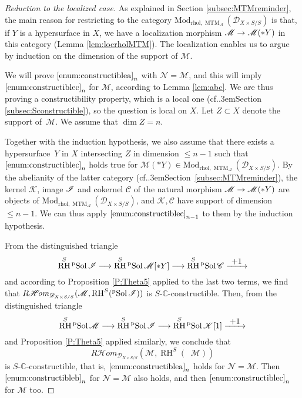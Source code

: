 \documentclass[english]{smfart}
\numberwithin{subsection}{section}
\def\sha{\mathcal{A}}\let\cA\sha
\def\shc{\mathcal{C}}
\def\shd{\mathcal{D}}\let\cD\shd
\def\shk{\mathcal{K}}\let\shk\shk
\def\shm{\mathcal{M}}
\def\shn{\mathcal{N}}\let\shn\shn
\newcommand{\C}{\mathbb{C}}\let\CC\C
\newcommand{\Rhom}{R\shhom}
\newcommand{\shhom}{\mathcal{H}\!\mathit{om}}\let\ho\shhom
\DeclareMathOperator{\RH}{RH}
\newcommand{\rhol}{\mathrm{rhol}}
\newcommand{\Mod}{\mathrm{Mod}}
\newcommand{\XS}{X\times S}
\newcommand{\DXS}{\shd_{\XS/S}}
\DeclareMathOperator{\MTM}{MTM}
\DeclareMathOperator{\pSol}{{}^\mathrm{p}Sol}
\let\leq\leqslant
\def\cf{cf.\kern.3em}
\numberwithin{equation}{section}
\theoremstyle{plain}
\theoremstyle{definition}
\def\to{\mathchoice{\longrightarrow}{\rightarrow}{\rightarrow}{\rightarrow}}
\def\To#1{\mathchoice{\xrightarrow{\textstyle\kern4pt#1\kern3pt}}{\stackrel{#1}{\longrightarrow}}{}{}}
\begin{document}
\begin{proof}[Reduction to the localized case]
As explained in Section \ref{subsec:MTMreminder}, the main reason for restricting to the category $\Mod_{\rhol,\MTM_\sha}(\DXS)$ is that, if $Y$ is a hypersurface in $X$, we have a localization morphism $\shm\to\shm(*Y)$ in this category (Lemma \ref{lem:locrholMTM}). The localization enables us to argue by induction on the dimension of the support of $\shm$.

We will prove $\eqref{enum:constructiblea}_n$ with $\shn=\shm$, and this will imply $\eqref{enum:constructiblec}_n$ for $\shm$, according to Lemma \ref{lem:abc}. We are thus proving a constructibility property, which is a local one (\cf Section \ref{subsec:Sconstructible}), so the question is local on $X$. Let $Z\subset X$ denote the support of~$\shm$. We assume that $\dim Z=n$.

Together with the induction hypothesis, we also assume that there exists a hypersurface~$Y$ in $X$ intersecting $Z$ in dimension $\leq n-1$ such that $\eqref{enum:constructiblec}_n$ holds true for $\shm(*Y)\in\Mod_{\rhol,\MTM_\sha}(\DXS)$. By the abelianity of the latter category (\cf Section~\ref{subsec:MTMreminder}), the kernel $\shk$, image $\cI$ and cokernel $\shc$ of the natural morphism $\shm\to\shm(*Y)$ are objects of $\Mod_{\rhol,\MTM_\sha}(\DXS)$, and $\shk,\shc$ have support of dimension $\leq n-1$. We can thus apply $\eqref{enum:constructiblec}_{n-1}$ to them by the induction hypothesis.

From the distinguished triangle
\[
\RH^S\pSol\cI\to\RH^S\pSol\shm[*Y]\to\RH^S\pSol\shc\To{+1}
\]
and according to Proposition \ref{P:Theta5} applied to the last two terms, we find that $\Rhom_{\DXS}(\shm, \RH^S(\pSol\cI))$ is $S$-$\C$-constructible. Then, from the distinguished triangle
\[
\RH^S\pSol\shm\to\RH^S\pSol\cI\to\RH^S\pSol\shk[1]\To{+1}
\]
and Proposition \ref{P:Theta5} applied similarly, we conclude that
\[
\Rhom_{\DXS}(\shm, \RH^S(\pSol\shm))
\]
is $S$-$\C$-constructible, that is, $\eqref{enum:constructiblea}_n$ holds for $\shn=\shm$. Then $\eqref{enum:constructibleb}_n$ for $\shn=\shm$ also holds, and then $\eqref{enum:constructiblec}_n$ for $\shm$ too.
\end{proof}
\end{document}
